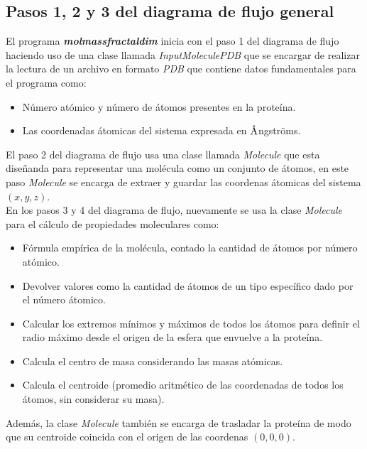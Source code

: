  
 \subsection {Pasos 1, 2 y 3 del diagrama de flujo general}
 
 El programa \textbf{\textit{molmassfractaldim}} inicia con el paso 1 del
 diagrama de flujo haciendo uso de una clase llamada 
 \textit{InputMoleculePDB} que se encargar de realizar la lectura de un 
 archivo en formato \textit{PDB} que contiene datos 
 fundamentales para el programa como: 
 
 \begin{itemize}
 	\item Número atómico y número de átomos presentes en la proteína.
 	\item Las coordenadas átomicas del sistema expresada en $\textup{\r{A}}$ngstr\"oms.
 \end{itemize}
 
El paso 2 del diagrama de flujo usa una clase llamada \textit{Molecule}
que esta diseñanda para representar una molécula como un conjunto de 
átomos, en este paso \textit{Molecule} se encarga de extraer y guardar las coordenas 
átomicas del sistema $(x, y, z)$.\\

En los pasos 3 y 4 del diagrama de flujo, nuevamente se usa la clase 
\textit{Molecule} para el cálculo de propiedades moleculares como:

\begin{itemize}
	\item Fórmula empírica de la molécula, contado la cantidad de átomos por número 
	atómico.
	\item Devolver valores como la cantidad de átomos de un tipo específico 
	dado por el número átomico.
	\item Calcular los extremos mínimos y máximos de todos los átomos para definir 
	el radio máximo desde el origen de la esfera que envuelve a la proteína.
	\item Calcula el centro de masa considerando las masas atómicas.
	\item Calcula el centroide (promedio aritmético de las coordenadas de todos los
	átomos, sin considerar su masa).
\end{itemize}

Además, la clase \textit{Molecule} también se encarga de trasladar la proteína de 
modo que su centroide coincida con el origen de las coordenas $(0, 0, 0)$.  



